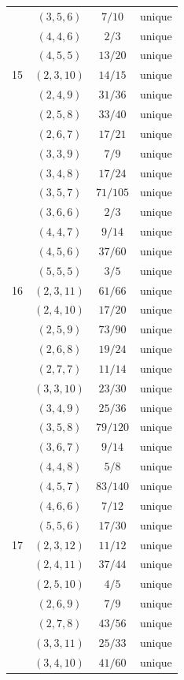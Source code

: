 \documentclass[12pt, letterpaper]{article}
\theoremstyle{definition}
\theoremstyle{plain}
\begin{document}
\begin{longtable}{cccc}
   & $(3,5,6)$ & $7/10$ & unique \\
   & $(4,4,6)$ & $2/3$ & unique \\
   & $(4,5,5)$ & $13/20$ & unique \\
\midrule
15 & $(2,3,10)$ & $14/15$ & unique \\
   & $(2,4,9)$ & $31/36$ & unique \\
   & $(2,5,8)$ & $33/40$ & unique \\
   & $(2,6,7)$ & $17/21$ & unique \\
   & $(3,3,9)$ & $7/9$ & unique \\
   & $(3,4,8)$ & $17/24$ & unique \\
   & $(3,5,7)$ & $71/105$ & unique \\
   & $(3,6,6)$ & $2/3$ & unique \\
   & $(4,4,7)$ & $9/14$ & unique \\
   & $(4,5,6)$ & $37/60$ & unique \\
   & $(5,5,5)$ & $3/5$ & unique \\
\midrule
16 & $(2,3,11)$ & $61/66$ & unique \\
   & $(2,4,10)$ & $17/20$ & unique \\
   & $(2,5,9)$ & $73/90$ & unique \\
   & $(2,6,8)$ & $19/24$ & unique \\
   & $(2,7,7)$ & $11/14$ & unique \\
   & $(3,3,10)$ & $23/30$ & unique \\
   & $(3,4,9)$ & $25/36$ & unique \\
   & $(3,5,8)$ & $79/120$ & unique \\
   & $(3,6,7)$ & $9/14$ & unique \\
   & $(4,4,8)$ & $5/8$ & unique \\
   & $(4,5,7)$ & $83/140$ & unique \\
   & $(4,6,6)$ & $7/12$ & unique \\
   & $(5,5,6)$ & $17/30$ & unique \\
\midrule
17 & $(2,3,12)$ & $11/12$ & unique \\
   & $(2,4,11)$ & $37/44$ & unique \\
   & $(2,5,10)$ & $4/5$ & unique \\
   & $(2,6,9)$ & $7/9$ & unique \\
   & $(2,7,8)$ & $43/56$ & unique \\
   & $(3,3,11)$ & $25/33$ & unique \\
   & $(3,4,10)$ & $41/60$ & unique \\

\end{longtable}
\end{document}
